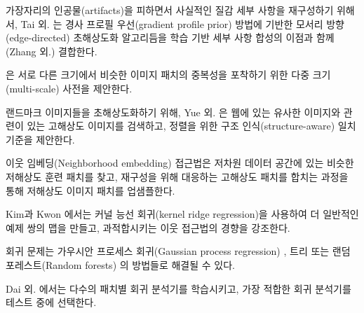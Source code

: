 \documentclass[10pt,twocolumn,letterpaper]{article}
\newcommand{\kor}[1]{#1}
\newcommand{\eng}[1]{}
\newcommand{\summary}[1]{}
\begin{document}
\summary{
저해상도와 고해상도의 복잡한 사상(mapping)을 만들어내는 더 강력한 접근 방식과 관련된 초창기 연구 및 방법들의 소개
}

\eng{
To reconstruct realistic texture detail while avoiding edge artifacts, Tai et al. \cite{Tai2010} combine an edge-directed \ac{SR} algorithm based on a gradient profile prior \cite{Sun2008} with the benefits of learning-based detail synthesis. Zhang et al.
}\kor{
가장자리의 인공물(artifacts)을 피하면서 사실적인 질감 세부 사항을 재구성하기 위해서, Tai 외. \cite{Tai2010}는 경사 프로필 우선(gradient profile prior)\cite{Sun2008} 방법에 기반한 모서리 방향(edge-directed) \ac{초해상도화} 알고리듬을 학습 기반 세부 사항 합성의 이점과 함께 (Zhang 외.) 결합한다.
} \eng{
\cite{zhang2012multi} propose a multi-scale dictionary to capture redundancies of similar image patches at different scales.
}\kor{
\cite{zhang2012multi}은 서로 다른 크기에서 비슷한 이미지 패치의 중복성을 포착하기 위한 다중 크기(multi-scale) 사전을 제안한다.
} %
\eng{
To super-resolve landmark images, Yue et al. \cite{Yue2013} retrieve correlating \ac{HR} images with similar content from the web and propose a structure-aware matching criterion for alignment.
}\kor{
랜드마크 이미지들을 초해상도화하기 위해, Yue 외. \cite{Yue2013}은 웹에 있는 유사한 이미지와 관련이 있는 \ac{고해상도} 이미지를 검색하고, 정렬을 위한 구조 인식(structure-aware) 일치 기준을 제안한다.
}

\summary {
경사 프로필 우선 알고리즘과 다중-크기 사전을 활용한 초해상도화 방법과 구조 인식 일치 기준을 제안한 연구들
}

\eng{
Neighborhood embedding approaches upsample a \ac{LR} image patch by finding similar \ac{LR} training patches in a low dimensional manifold and combining their corresponding \ac{HR} patches for reconstruction \cite{timofte2013anchored,timofte2014a+}.
}\kor{
이웃 임베딩(Neighborhood embedding) 접근법은 저차원 데이터 공간에 있는 비슷한 \ac{저해상도} 훈련 패치를 찾고, 재구성을 위해 대응하는 \ac{고해상도} 패치를 합치는 과정\cite{timofte2013anchored,timofte2014a+}을 통해 \ac{저해상도} 이미지 패치를 업샘플한다.
}
\eng{
In Kim and Kwon \cite{Kim10kernelregression} the authors emphasize the tendency of neighborhood approaches to overfit and formulate a more general map of example pairs using kernel ridge regression.
}\kor{
Kim과 Kwon \cite{Kim10kernelregression}에서는 커널 능선 회귀(kernel ridge regression)을 사용하여 더 일반적인 예제 쌍의 맵을 만들고, 과적합시키는 이웃 접근법의 경향을 강조한다.
}
\eng{
The regression problem can also be solved with Gaussian process regression \cite{he2011single}, trees \cite{salvador2015naive} or Random Forests \cite{schulter2015fast}.
}\kor{
회귀 문제는 가우시안 프로세스 회귀(Gaussian process regression) \cite{he2011single}, 트리 \cite{salvador2015naive} 또는 랜덤 포레스트(Random forests) \cite{schulter2015fast}의 방법들로 해결될 수 있다.
}
\eng{
In Dai et al. \cite{dai2015jointly} a multitude of patch-specific regressors is learned and the most appropriate regressors selected during testing.
}\kor{
Dai 외. \cite{dai2015jointly}에서는 다수의 패치별 회귀 분석기를 학습시키고, 가장 적합한 회귀 분석기를 테스트 중에 선택한다.
} %
\end{document}

